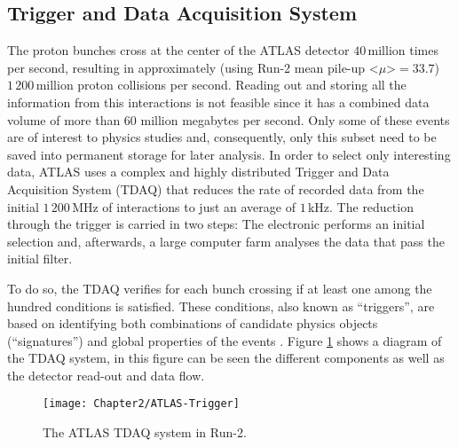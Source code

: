 \subsection{Trigger and Data Acquisition System}
\label{sec:Chap2:Trigger_and_DAQ}
The proton bunches cross at the center of the ATLAS detector $40\,$million times per second, resulting in approximately (using Run-2 mean pile-up <$\mu$>$=33.7$)
 $1\,200\,$million proton collisions per second. 
Reading out and storing all the information from this interactions is not feasible since it has a combined data volume of more than 60 million megabytes per second.
Only some of these events are of interest to physics studies and, consequently, only this subset need to be saved into permanent storage for later analysis.
In order to select only interesting data, ATLAS uses a complex and highly distributed Trigger and Data Acquisition System (TDAQ) 
\cite{ATLAS:2003aa} that reduces the rate of 
recorded data from the initial $1\,200\,$MHz of interactions to just an average of $1\,$kHz. The reduction through the trigger is carried in two steps: 
The electronic performs an initial selection and, afterwards, a large computer farm analyses the data that pass the initial filter. 


To do so, the TDAQ verifies for each bunch crossing if at least one among the hundred conditions is satisfied. 
These conditions, also known as ``triggers'', are based on identifying both combinations of candidate physics objects (``signatures'') %
and global properties of the events \cite{ATLAS:2012nks}. %
Figure \ref{fig:Chap2:ATLAS:Trigger} shows a diagram of the TDAQ system, in this figure can be seen the different components 
as well as the detector read-out and data flow.

 \begin{figure}
	\centering
	\texttt{[image: Chapter2/ATLAS-Trigger]}
	\caption{The ATLAS TDAQ system in Run-2.}
	\label{fig:Chap2:ATLAS:Trigger}
\end{figure}



